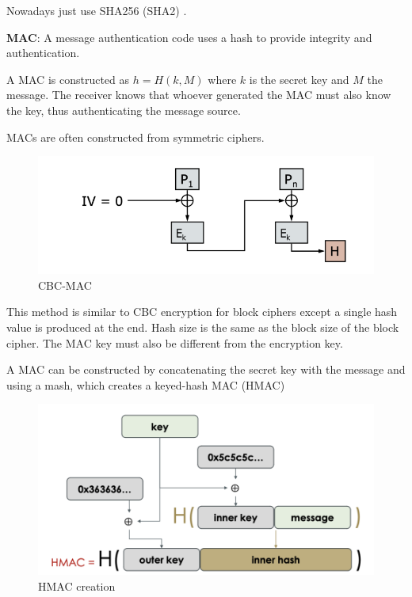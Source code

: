 \documentclass[../notes.tex]{subfiles}
\begin{document}
Nowadays just use SHA256 (SHA2) .



\begin{definition}
    \textbf{MAC}: A message authentication code uses a hash to provide integrity and authentication.

    A MAC is constructed as $ h = H(k, M) $ where $ k $ is the secret key and $ M $ the message. The receiver knows that whoever generated the MAC must also know the key, thus authenticating the message source.
\end{definition}


MACs are often constructed from symmetric ciphers.


\begin{figure}[H]
    \centering
    \includegraphics[width=0.8\linewidth]{img/image_2023-02-13-19-10-15.png}
    \caption{CBC-MAC}
\end{figure}

This method is similar to CBC encryption for block ciphers except a single hash value is produced at the end. Hash size is the same as the block size of the block cipher.
The MAC key must also be different from the encryption key.

A MAC can be constructed by concatenating the secret key with the message and using a mash, which creates a keyed-hash MAC (HMAC)

\begin{figure}[H]
    \centering
    \includegraphics[width=0.8\linewidth]{img/image_2023-02-13-19-14-44.png}
    \caption{HMAC creation}
\end{figure}
\end{document}
